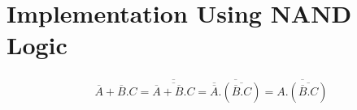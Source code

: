 \documentclass[journal,12pt]{IEEEtran}
\begin{document}
\section{\textbf{Implementation Using NAND Logic}}
\begin{align}
    \overline{A}+\overline{B}.C=\overline{\overline{\overline{A}+\overline{B}.C}}=\overline{\overline{\overline{A}}.(\overline{\overline{B}.C})}=\overline{A.(\overline{\overline{B}.C})}
\end{align}
\end{document}
